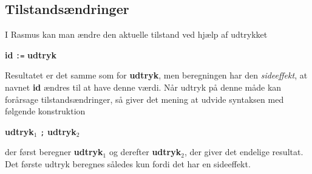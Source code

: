 \subsection{Tilstands\ae{}ndringer}
I {\sc Rasmus} kan man \ae{}ndre den aktuelle tilstand ved hj\ae{}lp af 
udtrykket
\begin{center}
{\bf id} \verb":=" {\bf udtryk}
\end{center}
Resultatet er det samme som for {\bf udtryk}, men beregningen har
den {\em sideeffekt}, at navnet {\bf id} \ae{}ndres til at have denne
v\ae{}rdi. N\aa{}r udtryk p\aa{} denne m\aa{}de kan for\aa{}rsage tilstands\ae{}ndringer, s\aa{}
giver det mening at udvide syntaksen med f\o{}lgende konstruktion
\begin{center}
{\bf udtryk$_1$} \verb";" {\bf udtryk$_2$}
\end{center}
der f\o{}rst beregner {\bf udtryk$_1$} og derefter {\bf udtryk$_2$},
der giver det endelige resultat. Det f\o{}rste udtryk beregnes s\aa{}ledes
kun fordi det har en sideeffekt.



